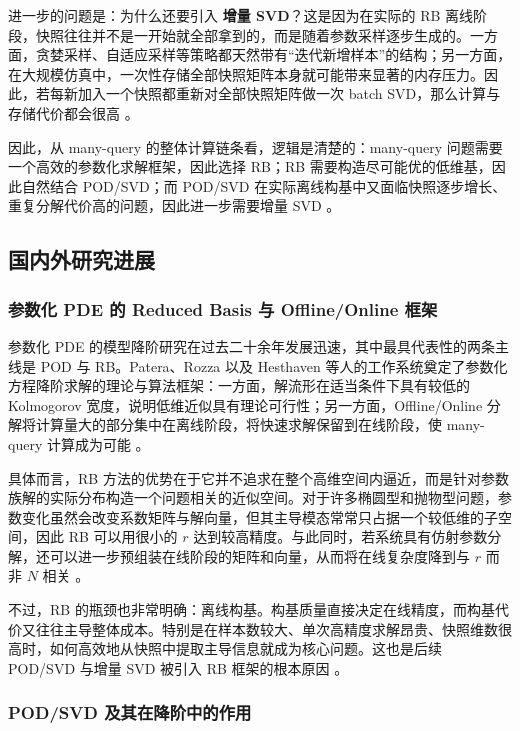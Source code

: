 进一步的问题是：为什么还要引入 \textbf{增量 SVD}？这是因为在实际的 RB 离线阶段，快照往往并不是一开始就全部拿到的，而是随着参数采样逐步生成的。一方面，贪婪采样、自适应采样等策略都天然带有“迭代新增样本”的结构；另一方面，在大规模仿真中，一次性存储全部快照矩阵本身就可能带来显著的内存压力。因此，若每新加入一个快照都重新对全部快照矩阵做一次 batch SVD，那么计算与存储代价都会很高 。

因此，从 many-query 的整体计算链条看，逻辑是清楚的：many-query 问题需要一个高效的参数化求解框架，因此选择 RB；RB 需要构造尽可能优的低维基，因此自然结合 POD/SVD；而 POD/SVD 在实际离线构基中又面临快照逐步增长、重复分解代价高的问题，因此进一步需要增量 SVD \cite{brand2002,brand2006,zhang2022}。

\subsection{国内外研究进展}

\subsubsection{参数化 PDE 的 Reduced Basis 与 Offline/Online 框架}

参数化 PDE 的模型降阶研究在过去二十余年发展迅速，其中最具代表性的两条主线是 POD 与 RB。Patera、Rozza 以及 Hesthaven 等人的工作系统奠定了参数化方程降阶求解的理论与算法框架：一方面，解流形在适当条件下具有较低的 Kolmogorov 宽度，说明低维近似具有理论可行性；另一方面，Offline/Online 分解将计算量大的部分集中在离线阶段，将快速求解保留到在线阶段，使 many-query 计算成为可能 \cite{patera_rozza,hesthaven2015}。

具体而言，RB 方法的优势在于它并不追求在整个高维空间内逼近，而是针对参数族解的实际分布构造一个问题相关的近似空间。对于许多椭圆型和抛物型问题，参数变化虽然会改变系数矩阵与解向量，但其主导模态常常只占据一个较低维的子空间，因此 RB 可以用很小的 $r$ 达到较高精度。与此同时，若系统具有仿射参数分解，还可以进一步预组装在线阶段的矩阵和向量，从而将在线复杂度降到与 $r$ 而非 $N$ 相关 \cite{hesthaven2015,patera_rozza}。

不过，RB 的瓶颈也非常明确：离线构基。构基质量直接决定在线精度，而构基代价又往往主导整体成本。特别是在样本数较大、单次高精度求解昂贵、快照维数很高时，如何高效地从快照中提取主导信息就成为核心问题。这也是后续 POD/SVD 与增量 SVD 被引入 RB 框架的根本原因 \cite{hesthaven2015,fareed2018}。

\subsubsection{POD/SVD 及其在降阶中的作用}


